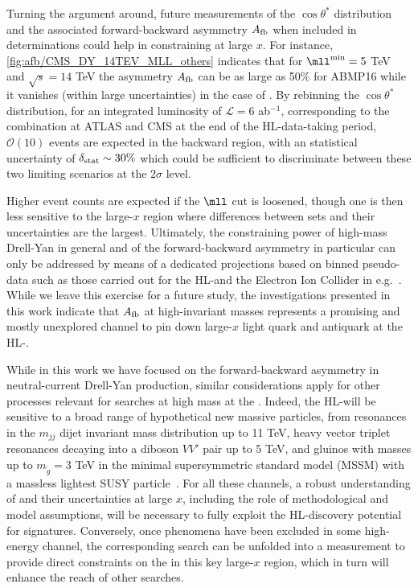 Turning the argument around, future measurements of the $\cos\theta^*$
distribution and the associated forward-backward asymmetry 
$A_{\rm fb}$ when included in \pdf determinations could help in
constraining \pdfs at large $x$.
%
For instance, \cref{fig:afb/CMS_DY_14TEV_MLL_others} indicates that for
$\mll^{\rm min}=5$ TeV and $\sqrt{s}=14$ TeV the
asymmetry $A_{\rm fb}$ can be as large as 50\% for ABMP16
while it vanishes (within large uncertainties) in the case of .
%
By rebinning the $\cos\theta^*$ distribution, for an integrated
luminosity of $\mathcal{L}=6$ ab$^{-1}$, corresponding to the
combination at ATLAS and CMS 
at the end of the HL-\lhc data-taking period, $\mathcal{O}(10)$ events are expected in the backward region,
with an statistical uncertainty of $\delta_{\rm stat}\sim 30\%$ which could be sufficient to
discriminate between these two limiting scenarios at the $2\sigma$ level.

Higher event counts are expected if the $\mll$ cut is loosened, though one is
then less sensitive to the large-$x$ region where differences between \pdf sets and their
uncertainties are the largest.
%
Ultimately, the constraining power of high-mass Drell-Yan in general and of the forward-backward
asymmetry in particular can only be addressed by means of a dedicated projections
based on binned pseudo-data such as those carried
out for the HL-\lhc and the Electron Ion Collider in e.g.~\cite{AbdulKhalek:2018rok,Khalek:2021ulf}.
%
While we leave this exercise for a future study, the investigations
presented in this work indicate that $A_{\rm fb}$
at high-invariant masses represents a promising and mostly
unexplored channel to pin down large-$x$ light
quark and antiquark \pdfs at the HL-\lhc.

While in this work
we have focused on the forward-backward asymmetry in neutral-current Drell-Yan production,
similar considerations apply for other processes relevant
for \bsm searches at high mass at the \lhc.
%
Indeed, the HL-\lhc will be sensitive to a broad range of hypothetical
new massive particles, from resonances in the $m_{jj}$ dijet invariant mass distribution up to 11 TeV,
heavy vector triplet resonances decaying into a diboson $VV'$ pair up to 5 TeV,
and gluinos with masses up to $m_{\tilde{g}}=3$ TeV in the minimal
supersymmetric standard model (MSSM) with a massless lightest SUSY
particle~\cite{CidVidal:2018eel}.
%
For all these channels, a robust understanding of \pdfs
and their uncertainties at large $x$, including the role of
methodological and model assumptions, will be necessary to fully exploit
the HL-\lhc discovery potential for \bsm signatures.
%
%
Conversely, once \bsm phenomena have been excluded in some high-energy channel,
the corresponding search can be unfolded into a measurement to provide direct
constraints on the \pdfs in this key large-$x$ region, which in turn will
enhance the reach of other searches.

